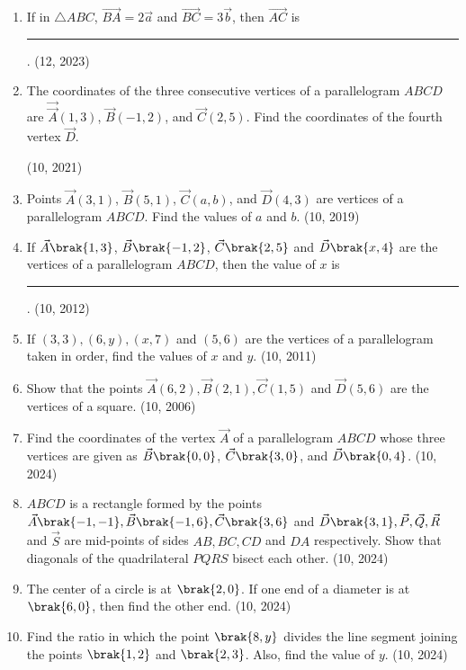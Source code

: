 \begin{enumerate}[label=\thesubsection.\arabic*, ref=\thesubsection.\theenumi]
    \item If in $\triangle ABC$, $\overrightarrow{BA} = 2\vec{a}$ and $\overrightarrow{BC} = 3\vec{b}$, then $\overrightarrow{AC}$ is
\rule{1cm}{0.2pt}.
    \hfill (12, 2023)
	\item The coordinates of the three consecutive vertices of a parallelogram $ABCD$ are $\vec{\vec{A}}(1, 3)$, $\vec{B}(-1, 2)$, and $\vec{C}(2, 5)$. Find the coordinates of the fourth vertex $\vec{D}$. 

		\hfill (10, 2021)
\item Points $\vec{A}(3, 1)$, $\vec{B}(5, 1)$, $\vec{C}(a, b)$, and $\vec{D}(4, 3)$ are vertices of a parallelogram $ABCD$. Find the values of $a$ and $b$. \hfill (10, 2019)
\item If $\vec{A}\brak{1,3}$, $\vec{B}\brak{-1,2}$, $\vec{C}\brak{2,5}$ and $\vec{D}\brak{x,4}$ are the vertices of a parallelogram $ABCD$, then the value of $x$ is
\rule{1cm}{0.2pt}.
\hfill (10, 2012)
    \item If $(3,3),(6,y),(x,7)$ and $(5,6)$ are the vertices of a parallelogram taken in order, find the values of $x$ and $y$.
\hfill (10, 2011)
\item Show that the points $\vec{A}(6, 2), \vec{B}(2, 1), \vec{C}(1, 5)$ and $\vec{D}(5, 6)$ are the vertices of a square.
\hfill	(10, 2006)
\item  Find the coordinates of the vertex $\vec{A}$ of a parallelogram $ABCD$ whose three vertices are given as $\vec{B}\brak{0,0}$, $\vec{C}\brak{3,0}$, and $\vec{D}\brak{0,4}$. 
\hfill	(10, 2024)
%
\item $ABCD$ is a rectangle formed by the points $ \vec{A}\brak{-1,-1}, \vec{B}\brak{-1, 6}, \vec{C}\brak{3, 6}$ and $\vec{D}\brak{3
	, 1}, \vec{P}, \vec{Q}, \vec{R}$ and $\vec{S}$ are mid-points of sides $AB, BC, CD$ and $DA$ respectively. Show that diagonals of the
 quadrilateral $PQRS$ bisect each other.
\hfill	(10, 2024)
    \item The center of a circle is at $\brak{2, 0}$. If one end of a diameter is at $\brak{6, 0}$, then find the other end. 
\hfill	(10, 2024)
\item Find the ratio in which the point $\brak{8, y}$ divides the line segment joining the points $\brak{1, 2}$ and $\brak{2, 3}$. Also, find the value of  $y$.
\hfill	(10, 2024)
\end{enumerate}
